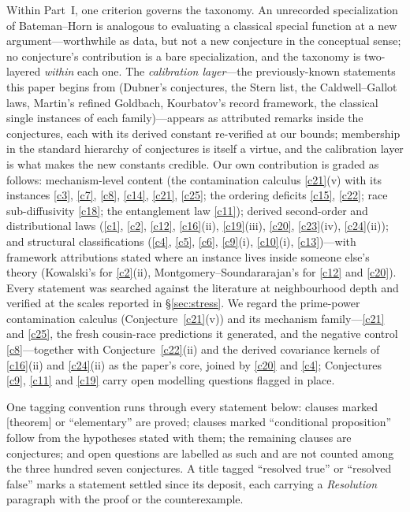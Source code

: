 \documentclass[11pt]{article}
\theoremstyle{definition}
\begin{document}
Within Part~I, one criterion governs the taxonomy.  An unrecorded specialization of
Bateman--Horn is analogous to evaluating a classical special function
at a new argument---worthwhile as data, but not a new conjecture in the
conceptual sense; no conjecture's contribution is a bare
specialization, and the taxonomy is two-layered \emph{within} each one.
The \emph{calibration layer}---the previously-known statements this
paper begins from (Dubner's conjectures, the Stern list, the
Caldwell--Gallot laws, Martin's refined Goldbach, Kourbatov's record
framework, the classical single instances of each family)---appears
as attributed remarks inside the conjectures, each with its derived
constant re-verified at our bounds; membership in the standard
hierarchy of conjectures is itself a virtue, and the calibration layer
is what makes the new constants credible.  Our own
contribution is graded as follows: mechanism-level content
(the contamination calculus \ref{c21}(v) with its instances
\ref{c3}, \ref{c7}, \ref{c8}, \ref{c14}, \ref{c21}, \ref{c25}; the
ordering deficits \ref{c15}, \ref{c22}; race sub-diffusivity
\ref{c18}; the entanglement law \ref{c11}); derived second-order and
distributional laws (\ref{c1}, \ref{c2}, \ref{c12}, \ref{c16}(ii),
\ref{c19}(iii), \ref{c20}, \ref{c23}(iv), \ref{c24}(ii)); and
structural classifications (\ref{c4}, \ref{c5}, \ref{c6},
\ref{c9}(i), \ref{c10}(i), \ref{c13})---with framework attributions
stated where an instance lives inside someone else's theory
(Kowalski's for \ref{c2}(ii), Montgomery--Soundararajan's for
\ref{c12} and \ref{c20}).  Every statement was searched against the literature at neighbourhood depth and
verified at the scales reported in \S\ref{sec:stress}.  We
regard the
prime-power contamination calculus (Conjecture~\ref{c21}(v)) and its
mechanism family---\ref{c21} and \ref{c25}, the fresh cousin-race
predictions it generated, and the negative control
\ref{c8}---together with Conjecture~\ref{c22}(ii) and the derived
covariance kernels of \ref{c16}(ii) and \ref{c24}(ii) as the paper's
core, joined by \ref{c20} and \ref{c4}; Conjectures \ref{c9},
\ref{c11} and \ref{c19} carry open modelling questions flagged in
place.

One tagging convention runs through every statement below: clauses
marked [theorem] or ``elementary'' are proved; clauses marked
``conditional proposition'' follow from the hypotheses stated with
them; the remaining clauses are conjectures; and open questions are labelled as such and are not counted among the three hundred seven conjectures.  A title tagged ``resolved true'' or ``resolved false'' marks a statement settled since its deposit, each carrying a \emph{Resolution} paragraph with the proof or the counterexample.
\end{document}
